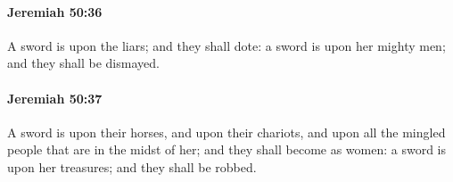 		\paragraph{Jeremiah 50:36} %
			\label{JEREMIAH-50-36}

			A sword is upon the liars; and they shall dote: a sword is upon her mighty men; and they shall be dismayed.


		\paragraph{Jeremiah 50:37} %
			\label{JEREMIAH-50-37}

			A sword is upon their horses, and upon their chariots, and upon all the mingled people that are in the midst of her; and they shall become as women: a sword is upon her treasures; and they shall be robbed.


